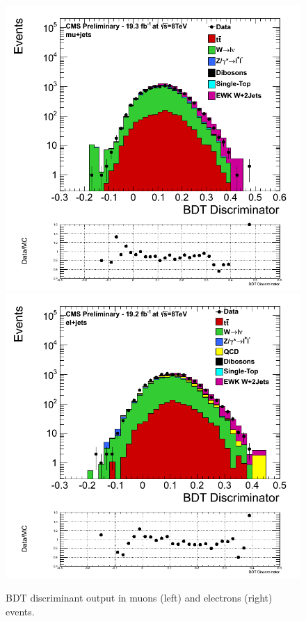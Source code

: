 \begin{figure}[ht]
\centerline{
\includegraphics[width=.49\textwidth]{figs/bdtoutput/EWKW2jetsplotmu_mjj1000.png}
\includegraphics[width=.49\textwidth]{figs/bdtoutput/EWKW2jetsplotelmjj1000.png}
}
\caption{BDT discriminant output in muons (left) and electrons (right) events.}
\label{fig:BDToutputdistribution}
\end{figure}


%

\clearpage
